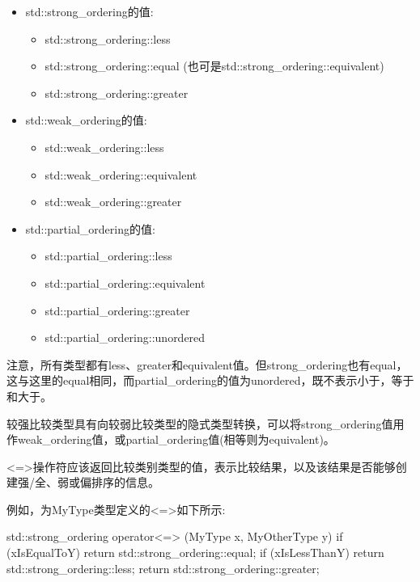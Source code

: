 \begin{itemize}
\item
std::strong\_ordering的值:
\begin{itemize}
\item
std::strong\_ordering::less

\item
std::strong\_ordering::equal (也可是std::strong\_ordering::equivalent)

\item
std::strong\_ordering::greater
\end{itemize}

\item
std::weak\_ordering的值:
\begin{itemize}
\item
std::weak\_ordering::less

\item
std::weak\_ordering::equivalent

\item
std::weak\_ordering::greater
\end{itemize}

\item
std::partial\_ordering的值:
\begin{itemize}
\item
std::partial\_ordering::less

\item
std::partial\_ordering::equivalent

\item
std::partial\_ordering::greater

\item
std::partial\_ordering::unordered
\end{itemize}
\end{itemize}

注意，所有类型都有less、greater和equivalent值。但strong\_ordering也有equal，这与这里的equal相同，而partial\_ordering的值为unordered，既不表示小于，等于和大于。

较强比较类型具有向较弱比较类型的隐式类型转换，可以将strong\_ordering值用作weak\_ordering值，或partial\_ordering值(相等则为equivalent)。


<=>操作符应该返回比较类别类型的值，表示比较结果，以及该结果是否能够创建强/全、弱或偏排序的信息。

例如，为MyType类型定义的<=>如下所示:

\begin{cpp}
std::strong_ordering operator<=> (MyType x, MyOtherType y)
{
	if (xIsEqualToY) return std::strong_ordering::equal;
	if (xIsLessThanY) return std::strong_ordering::less;
	return std::strong_ordering::greater;
}
\end{cpp}

